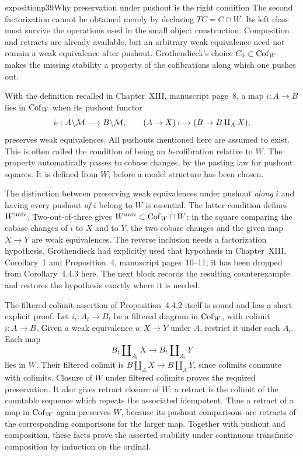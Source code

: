 \begin{dcomment}{exposition}{p39}{Why preservation under pushout is the right condition}
The second factorization cannot be obtained merely by declaring $TC=C\cap W$. Its left class must survive the operations used in the small object construction. Composition and retracts are already available, but an arbitrary weak equivalence need not remain a weak equivalence after pushout. Grothendieck's choice $C_0\subset\mathrm{Cof}_W$ makes the missing stability a property of the cofibrations along which one pushes out.

With the definition recalled in Chapter~XIII, manuscript page~8, a map $i:A\to B$ lies in $\mathrm{Cof}_W$ when its pushout functor
\[
i_!:A\backslash\mathcal{M}\longrightarrow B\backslash\mathcal{M},
\qquad (A\to X)\longmapsto(B\to B\amalg_A X),
\]
preserves weak equivalences. All pushouts mentioned here are assumed to exist. This is often called the condition of being an $h$-cofibration relative to $W$. The property automatically passes to cobase changes, by the pasting law for pushout squares. It is defined from $W$, before a model structure has been chosen.

The distinction between preserving weak equivalences under pushout \emph{along} $i$ and having every pushout \emph{of} $i$ belong to $W$ is essential. The latter condition defines $W^{\mathrm{univ}}$. Two-out-of-three gives $W^{\mathrm{univ}}\subset\mathrm{Cof}_W\cap W$: in the square comparing the cobase changes of $i$ to $X$ and to $Y$, the two cobase changes and the given map $X\to Y$ are weak equivalences. The reverse inclusion needs a factorization hypothesis. Grothendieck had explicitly used that hypothesis in Chapter~XIII, Corollary~1 and Proposition~4, manuscript pages~10--11; it has been dropped from Corollary~4.4.3 here. The next block records the resulting counterexample and restores the hypothesis exactly where it is needed.

The filtered-colimit assertion of Proposition~4.4.2 itself is sound and has a short explicit proof. Let $i_t:A_t\to B_t$ be a filtered diagram in $\mathrm{Cof}_W$, with colimit $i:A\to B$. Given a weak equivalence $u:X\to Y$ under $A$, restrict it under each $A_t$. Each map
\[
B_t\amalg_{A_t}X\longrightarrow B_t\amalg_{A_t}Y
\]
lies in $W$. Their filtered colimit is $B\amalg_A X\to B\amalg_A Y$, since colimits commute with colimits. Closure of $W$ under filtered colimits proves the required preservation. It also gives retract closure of $W$: a retract is the colimit of the countable sequence which repeats the associated idempotent. Thus a retract of a map in $\mathrm{Cof}_W$ again preserves $W$, because its pushout comparisons are retracts of the corresponding comparisons for the larger map. Together with pushout and composition, these facts prove the asserted stability under continuous transfinite composition by induction on the ordinal.
\end{dcomment}


